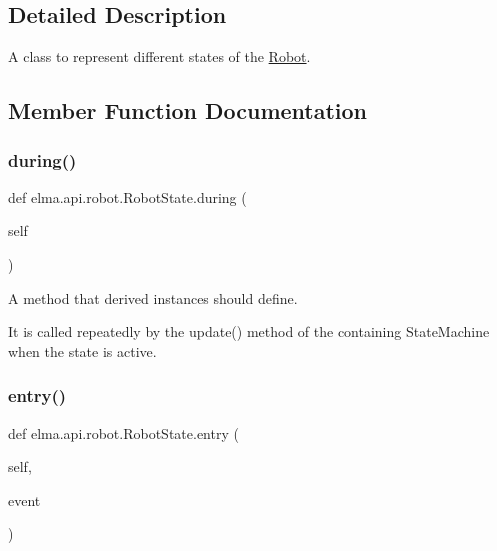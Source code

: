 \subsection{Detailed Description}
A class to represent different states of the \hyperlink{classelma_1_1api_1_1robot_1_1Robot}{Robot}. 



\subsection{Member Function Documentation}
\mbox{\label{classelma_1_1api_1_1robot_1_1RobotState_afc16183bb851de813f3269937c2360a6}} 
\subsubsection{\texorpdfstring{during()}{during()}}
{\footnotesize\ttfamily def elma.\+api.\+robot.\+Robot\+State.\+during (\begin{DoxyParamCaption}\item[{}]{self }\end{DoxyParamCaption})}



A method that derived instances should define. 

It is called repeatedly by the update() method of the containing State\+Machine when the state is active. \mbox{\label{classelma_1_1api_1_1robot_1_1RobotState_a13a44c6ec8836f2235982916b615c977}} 
\subsubsection{\texorpdfstring{entry()}{entry()}}
{\footnotesize\ttfamily def elma.\+api.\+robot.\+Robot\+State.\+entry (\begin{DoxyParamCaption}\item[{}]{self,  }\item[{}]{event }\end{DoxyParamCaption})}



